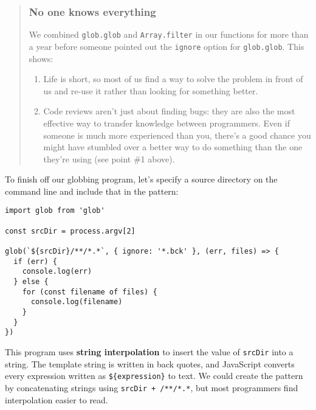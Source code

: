 \documentclass[krantzl]{krantz}
\newcommand{\glossref}[1]{\textbf{#1}}
\newenvironment{callout}{\savenotes\begin{tBox}\begin{quotation}\toggletrue{inbox}\renewcommand{\thempfootnote}{\arabic{footnote}}}{\end{quotation}\vspace{\baselineskip}\end{tBox}\togglefalse{inbox}\spewnotes}
\begin{document}
\begin{callout}


\subsubsection*{No one knows everything}


We combined \texttt{glob.glob} and \texttt{Array.filter} in our functions for more than a year
before someone pointed out the \texttt{ignore} option for \texttt{glob.glob}.
This shows:

\begin{enumerate}

\item 

Life is short,
    so most of us find a way to solve the problem in front of us
    and re-use it rather than looking for something better.



\item 

Code reviews aren’t just about finding bugs:
    they are also the most effective way to transfer knowledge between programmers.
    Even if someone is much more experienced than you,
    there’s a good chance you might have stumbled over a better way to do something
    than the one they’re using (see point \#1 above).



\end{enumerate}

\end{callout}


To finish off our globbing program,
let’s specify a source directory on the command line and include that in the pattern:


\begin{lstlisting}[frame=tblr]
import glob from 'glob'

const srcDir = process.argv[2]

glob(`${srcDir}/**/*.*`, { ignore: '*.bck' }, (err, files) => {
  if (err) {
    console.log(err)
  } else {
    for (const filename of files) {
      console.log(filename)
    }
  }
})
\end{lstlisting}



\noindent This program uses \glossref{string interpolation}
to insert the value of \texttt{srcDir} into a string.
The template string is written in back quotes,
and JavaScript converts every expression written as \texttt{\$\{expression\}} to text.
We could create the pattern by concatenating strings using
\texttt{srcDir + {\textquotesingle}/**/*.*{\textquotesingle}},
but most programmers find interpolation easier to read.
\end{document}
